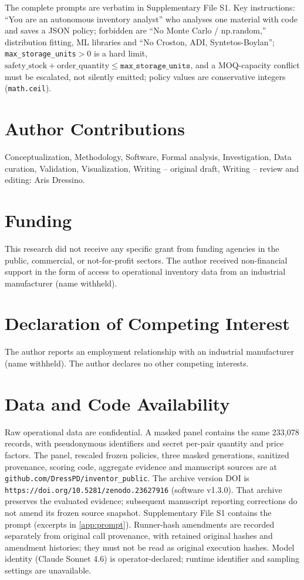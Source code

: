\documentclass[preprint,12pt,nonatbib]{elsarticle}
\begin{document}
The complete prompts are verbatim in Supplementary File S1. Key instructions: ``You are an autonomous inventory analyst'' who analyses one material with code and saves a JSON policy; forbidden are ``No Monte Carlo / np.random,'' distribution fitting, ML libraries and ``No Croston, ADI, Syntetos-Boylan''; \texttt{max\_storage\_units}$>0$ is a hard limit, $\mathrm{safety\_stock}+\mathrm{order\_quantity}\le\texttt{max\_storage\_units}$, and a MOQ-capacity conflict must be escalated, not silently emitted; policy values are conservative integers (\texttt{math.ceil}).

\section*{Author Contributions}
Conceptualization, Methodology, Software, Formal analysis, Investigation, Data curation, Validation, Visualization, Writing -- original draft, Writing -- review and editing: Aris Dressino.

\section*{Funding}
This research did not receive any specific grant from funding agencies in the public, commercial, or not-for-profit sectors.
The author received non-financial support in the form of access to operational inventory data from an industrial manufacturer (name withheld).

\section*{Declaration of Competing Interest}
The author reports an employment relationship with an industrial manufacturer (name withheld). The author declares no other competing interests.

\section*{Data and Code Availability}
Raw operational data are confidential. A masked panel contains the same 233{,}078 records, with pseudonymous identifiers and secret per-pair quantity and price factors. The panel, rescaled frozen policies, three masked generations, sanitized provenance, scoring code, aggregate evidence and manuscript sources are at \texttt{github.com/DressPD/inventor\_public}. The archive version DOI is \texttt{https://doi.org/10.5281/zenodo.23627916} (software v1.3.0). That archive preserves the evaluated evidence; subsequent manuscript reporting corrections do not amend its frozen source snapshot. Supplementary File S1 contains the prompt (excerpts in \ref{app:prompt}). Runner-hash amendments are recorded separately from original call provenance, with retained original hashes and amendment histories; they must not be read as original execution hashes. Model identity (Claude Sonnet 4.6) is operator-declared; runtime identifier and sampling settings are unavailable.
\end{document}
